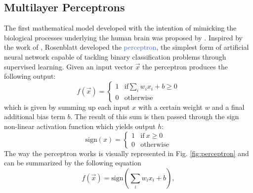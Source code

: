 \subsection{Multilayer Perceptrons}
\label{sec:general_architecture}
The first mathematical model developed with the intention of mimicking the biological processes underlying the human brain was proposed by \citet{rosenblatt1958perceptron}. Inspired by the work of \citet{mcculloch1943logical}, Rosenblatt developed the \textcolor{RoyalBlue}{perceptron}, the simplest form of artificial neural network capable of tackling binary classification problems through supervised learning. Given an input vector $\vec{x}$ the perceptron produces the following output:
\begin{equation}
	f(\vec{x}) = 
		\begin{cases}
			1  & \text{if} \sum_i w_i x_i + b \geq 0 \\
			0 & \text{otherwise}
		\end{cases}
\end{equation}
which is given by summing up each input $x$ with a certain weight $w$ and a final additional bias term $b$. The result of this sum is then passed through the sign non-linear activation function which yields output $h$:
\begin{equation}
	\text{sign}(x) = 
		\begin{cases}
			1  & \text{if} \: x \geq 0 \\
			0 & \text{otherwise}
		\end{cases}
\end{equation}
The way the perceptron works is visually represented in Fig. \ref{fig:perceptron} and can be summarized by the following equation
\begin{equation}
	f(\vec{x}) = \text{sign}(\sum_i w_i x_i + b),
	\label{eq:perceptron_equation}
\end{equation}

